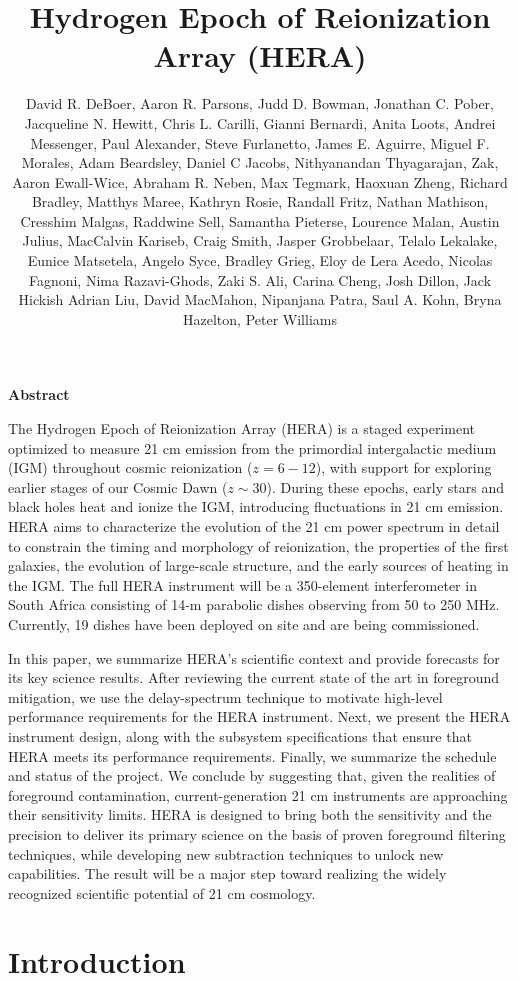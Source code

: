 \documentclass[preprint,11pt]{aastex}
\title{Hydrogen Epoch of Reionization Array (HERA)}
\author{David R. DeBoer, Aaron R. Parsons, Judd D. Bowman, Jonathan C. Pober, Jacqueline N. Hewitt, Chris L. Carilli, Gianni Bernardi, Anita Loots, Andrei Messenger, Paul Alexander, Steve Furlanetto, James E. Aguirre, Miguel F. Morales, Adam Beardsley, Daniel C Jacobs, Nithyanandan Thyagarajan, Zak, Aaron Ewall-Wice, Abraham R. Neben, Max Tegmark, Haoxuan Zheng, Richard Bradley, Matthys Maree, Kathryn Rosie, Randall Fritz, Nathan Mathison, Cresshim Malgas, Raddwine Sell, Samantha Pieterse, Lourence Malan, Austin Julius, MacCalvin Kariseb, Craig Smith, Jasper Grobbelaar, Telalo Lekalake, Eunice Matsetela, Angelo Syce, Bradley Grieg, Eloy de Lera Acedo, Nicolas Fagnoni, Nima Razavi-Ghods, Zaki S. Ali, Carina Cheng, Josh Dillon, Jack Hickish Adrian Liu, David MacMahon, Nipanjana Patra, Saul A. Kohn, Bryna Hazelton, Peter Williams}
\begin{document}
\maketitle

\begin{center}
\textbf{Abstract}
\end{center}

The Hydrogen Epoch of Reionization Array (HERA) is a staged experiment
optimized to measure 21 cm emission from the primordial
intergalactic medium (IGM) throughout cosmic reionization ($z=6-12$), with
support for exploring earlier stages of our Cosmic Dawn ($z\sim30$).  During these
epochs, early stars and black holes heat and ionize the IGM, introducing
fluctuations in 21 cm emission.  HERA aims to characterize the evolution of the 21 cm
power spectrum in detail to constrain the timing and morphology of
reionization, the properties of the first galaxies, the evolution of
large-scale structure, and the early sources of heating in the IGM.  
The full HERA instrument will be a
350-element interferometer in South Africa consisting of 14-m parabolic dishes observing from 50 to 250 MHz.
Currently, 19 dishes have been deployed on site and are being commissioned.

In this paper, we summarize HERA's scientific context and provide forecasts for
its key science results.  After reviewing the current state of the art in
foreground mitigation, we use the delay-spectrum technique to
motivate high-level performance requirements for the HERA instrument.  Next,
we present the HERA instrument design, along with the subsystem specifications that
ensure that HERA meets its performance requirements.  Finally, we summarize the schedule
and status of the project.  We conclude by suggesting that, given the realities of foreground
contamination, current-generation 21 cm instruments are approaching their sensitivity limits.
HERA is designed to bring both the
sensitivity and the precision to deliver its primary science on the basis of
proven foreground filtering techniques, while developing new subtraction
techniques to unlock new capabilities.  The result will be a major step toward
realizing the widely recognized scientific potential of 21 cm cosmology.

\section{Introduction}
\end{document}
